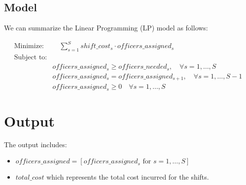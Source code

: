 \documentclass{article}
\begin{document}
\subsection*{Model}
We can summarize the Linear Programming (LP) model as follows:

\begin{align*}
\text{Minimize:} & \quad \sum_{s=1}^{S} shift\_cost_s \cdot officers\_assigned_s \\
\text{Subject to:} & \\
& officers\_assigned_s \geq officers\_needed_s, \quad \forall s = 1, \ldots, S \\
& officers\_assigned_s = officers\_assigned_{s+1}, \quad \forall s = 1, \ldots, S-1 \\
& officers\_assigned_s \geq 0 \quad \forall s = 1, \ldots, S
\end{align*}

\section*{Output}
The output includes:
\begin{itemize}
    \item \( officers\_assigned = [officers\_assigned_s \text{ for } s = 1, \ldots, S] \)
    \item \( total\_cost \) which represents the total cost incurred for the shifts.
\end{itemize}
\end{document}
